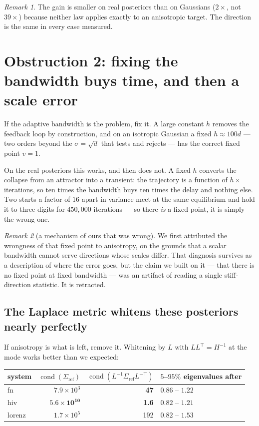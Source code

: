 \documentclass[11pt]{article}
\theoremstyle{remark}
\newtheorem{remark}{Remark}
\begin{document}
\begin{remark}
The gain is smaller on real posteriors than on Gaussians ($2\times$, not $39\times$) because
neither law applies exactly to an anisotropic target. The direction is the same in every case
measured.
\end{remark}

\section{Obstruction 2: fixing the bandwidth buys time, and then a scale error}
\label{sec:fixed}

If the adaptive bandwidth is the problem, fix it. A large constant $h$ removes the feedback loop by
construction, and on an isotropic Gaussian a fixed $h \approx 100d$ --- two orders beyond the
$\sigma = \sqrt d$ that \cite{ba2022} tests and rejects --- has the correct fixed point $v = 1$.

On the real posteriors this works, and then does not. A fixed $h$ converts the collapse from an
attractor into a transient: the trajectory is a function of $h \times$ iterations, so ten times the
bandwidth buys ten times the delay and nothing else. Two starts a factor of $16$ apart in variance
meet at the same equilibrium and hold it to three digits for $450{,}000$ iterations --- so there
\emph{is} a fixed point, it is simply the wrong one.

\begin{remark}[a mechanism of ours that was wrong]
We first attributed the wrongness of that fixed point to anisotropy, on the grounds that a scalar
bandwidth cannot serve directions whose scales differ. That diagnosis survives as a description of
where the error goes, but the claim we built on it --- that there is no fixed point at fixed
bandwidth --- was an artifact of reading a single stiff-direction statistic. It is retracted.
\end{remark}

\subsection{The Laplace metric whitens these posteriors nearly perfectly}

If anisotropy is what is left, remove it. Whitening by $L$ with $LL^\top = H^{-1}$ at the mode
works better than we expected:

\begin{center}\small
\begin{tabular}{lrrl}
\toprule
system & $\operatorname{cond}(\Sigma_{\mathrm{ref}})$ & $\operatorname{cond}(L^{-1}\Sigma_{\mathrm{ref}}L^{-\top})$ & $5$--$95\%$ eigenvalues after\\
\midrule
fn     & $7.9\times10^{3}$ & \textbf{47}  & $0.86$ -- $1.22$\\
hiv    & $\mathbf{5.6\times10^{10}}$ & \textbf{1.6} & $0.82$ -- $1.21$\\
lorenz & $1.7\times10^{5}$ & 192 & $0.82$ -- $1.53$\\
\bottomrule
\end{tabular}
\end{center}
\end{document}
